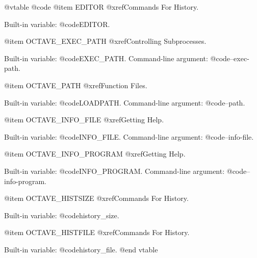 @vtable @code
@item EDITOR
@xref{Commands For History}.

Built-in variable: @code{EDITOR}.

@item OCTAVE_EXEC_PATH        
@xref{Controlling Subprocesses}.

Built-in variable: @code{EXEC_PATH}.
Command-line argument: @code{--exec-path}.

@item OCTAVE_PATH
@xref{Function Files}.

Built-in variable: @code{LOADPATH}.
Command-line argument: @code{--path}.

@item OCTAVE_INFO_FILE
@xref{Getting Help}.

Built-in variable: @code{INFO_FILE}.
Command-line argument: @code{--info-file}.

@item OCTAVE_INFO_PROGRAM
@xref{Getting Help}.

Built-in variable: @code{INFO_PROGRAM}.
Command-line argument: @code{--info-program}.

@item OCTAVE_HISTSIZE
@xref{Commands For History}.

Built-in variable: @code{history_size}.

@item OCTAVE_HISTFILE
@xref{Commands For History}.

Built-in variable: @code{history_file}.
@end vtable
